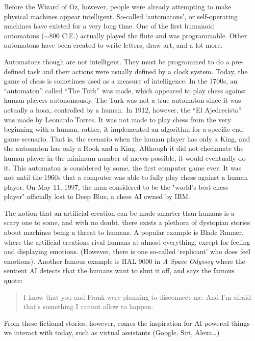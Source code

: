 \documentclass[letterpaper,12pt]{article}
\begin{document}
Before the Wizard of Oz, however, people were already attempting to make physical machines
appear intelligent. So-called `automatons', or self-operating machines have existed for
a very long time. One of the first humanoid automatons ($\sim$800 C.E.) actually played the flute and was programmable.\cite{automaton}
Other automatons have been created to write letters, draw art, and a lot more.

Automatons though are not intelligent.
They must be programmed to do a pre-defined task and their actions were
usually defined by a clock system.
Today, the game of chess is sometimes used as a measure of intelligence.
In the 1700s, an ``automaton'' called ``The Turk'' was made, which appeared to play chess
against human players autonomously.\cite{turk} The Turk was not a true automaton since
it was actually a hoax, controlled by a human. In 1912, however, the ``El Ajedrecista''
was made by Leonardo Torres.\cite{actualchessmachine} It was not made to play chess from the
very beginning with a human, rather, it implemented an algorithm for a
specific end-game scenario. That is, the scenario when the human player has
only a King, and the automaton has only a Rook and a King. Although it did not
checkmate the human player in the minimum number of moves possible, it would
eventually do it.
This automaton is considered by some, the first computer game ever.
It was not until the 1960s that a computer was able to fully play chess against a human player.\cite{computerchess}
On May 11, 1997, the man considered to be the "world's best chess player" officially lost to Deep Blue,
a chess AI owned by IBM.\cite{computerchess}


The notion that an artificial creation can be made smarter than humans is a scary one to some,
and with no doubt, there exists a plethora of dystopian stories about machines being a threat to humans.
A popular example is Blade Runner, where the artificial creations rival humans
at almost everything, except for feeling and displaying emotions. (However, there is one so-called `replicant'
who does feel emotions)\cite{bladerunner}. Another famous example is HAL 9000 in \textit{A Space Odyssey}
where the sentient AI detects that the humans want to shut it off, and says the
famous quote\cite{HAL}: 
\begin{quote}
   I know that you and Frank were planning to disconnect me. And I'm afraid that's something I cannot allow to happen.
\end{quote}

From these fictional stories, however, comes the inspiration for AI-powered things we interact with
today, such as virtual assistants (Google, Siri, Alexa\dots) 
\end{document}
